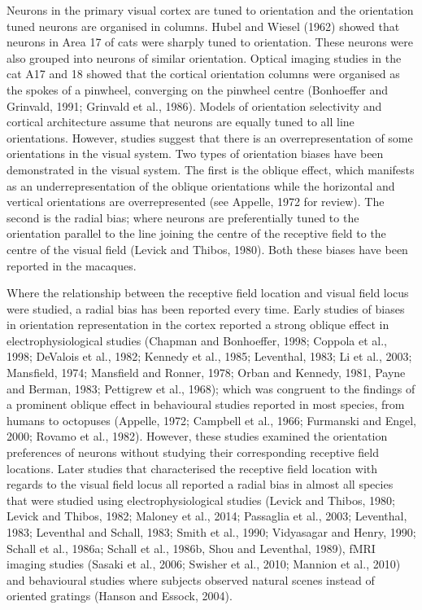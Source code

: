 	Neurons in the primary visual cortex are tuned to orientation and the orientation tuned neurons are organised in columns. Hubel and Wiesel (1962) showed that neurons in Area 17 of cats were sharply tuned to orientation. These neurons were also grouped into neurons of similar orientation. Optical imaging studies in the cat A17 and 18 showed that the cortical orientation columns were organised as the spokes of a pinwheel, converging on the pinwheel centre (Bonhoeffer and Grinvald, 1991; Grinvald et al., 1986). Models of orientation selectivity and cortical architecture assume that neurons are equally tuned to all line orientations. However, studies suggest that there is an overrepresentation of some orientations in the visual system. Two types of orientation biases have been demonstrated in the visual system. The first is the oblique effect, which manifests as an underrepresentation of the oblique orientations while the horizontal and vertical orientations are overrepresented (see Appelle, 1972 for review). The second is the radial bias; where neurons are preferentially tuned to the orientation parallel to the line joining the centre of the receptive field to the centre of the visual field (Levick and Thibos, 1980). Both these biases have been reported in the macaques.
	
	Where the relationship between the receptive field location and visual field locus were studied, a radial bias has been reported every time. Early studies of biases in orientation representation in the cortex reported a strong oblique effect in electrophysiological studies (Chapman and Bonhoeffer, 1998; Coppola et al., 1998; DeValois et al., 1982; Kennedy et al., 1985; Leventhal, 1983; Li et al., 2003; Mansfield, 1974; Mansfield and Ronner, 1978; Orban and Kennedy, 1981, Payne and Berman, 1983; Pettigrew et al., 1968); which was congruent to the findings of a prominent oblique effect in behavioural studies reported in most species, from humans to octopuses (Appelle, 1972; Campbell et al., 1966; Furmanski and Engel, 2000; Rovamo et al., 1982). However, these studies examined the orientation preferences of neurons without studying their corresponding receptive field locations. Later studies that characterised the receptive field location with regards to the visual field locus all reported a radial bias in almost all species that were studied using electrophysiological studies (Levick and Thibos, 1980; Levick and Thibos, 1982; Maloney et al., 2014; Passaglia et al., 2003; Leventhal, 1983; Leventhal and Schall, 1983; Smith et al., 1990; Vidyasagar and Henry, 1990; Schall et al., 1986a; Schall et al., 1986b, Shou and Leventhal, 1989), fMRI imaging studies (Sasaki et al., 2006; Swisher et al., 2010; Mannion et al., 2010) and behavioural studies where subjects observed natural scenes instead of oriented gratings (Hanson and Essock, 2004).
	
